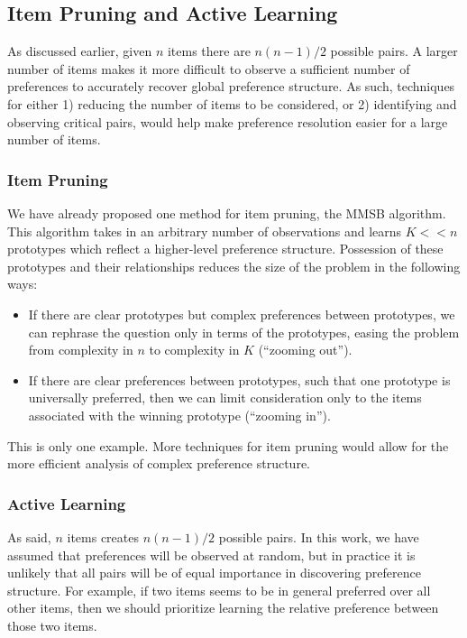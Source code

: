 \subsection{Item Pruning and Active Learning}

As discussed earlier, given $n$ items there are $n(n-1)/2$ possible pairs.
A larger number of items makes it more difficult to observe a sufficient number of preferences to accurately recover global preference structure.
As such, techniques for either 1) reducing the number of items to be considered, or 2) identifying and observing critical pairs, would help make preference resolution easier for a large number of items.

\subsubsection{Item Pruning}

We have already proposed one method for item pruning, the MMSB algorithm.
This algorithm takes in an arbitrary number of observations and learns $K << n$ prototypes which reflect a higher-level preference structure.
Possession of these prototypes and their relationships reduces the size of the problem in the following ways: 

\begin{itemize}
	\item If there are clear prototypes but complex preferences between prototypes, we can rephrase the question only in terms of the prototypes, easing the problem from complexity in $n$ to complexity in $K$ (``zooming out'').
	\item If there are clear preferences between prototypes, such that one prototype is universally preferred, then we can limit consideration only to the items associated with the winning prototype (``zooming in'').
\end{itemize}

This is only one example.
More techniques for item pruning would allow for the more efficient analysis of complex preference structure.

\subsubsection{Active Learning}

As said, $n$ items creates $n(n-1)/2$ possible pairs.
In this work, we have assumed that preferences will be observed at random, but in practice it is unlikely that all pairs will be of equal importance in discovering preference structure.
For example, if two items seems to be in general preferred over all other items, then we should prioritize learning the relative preference between those two items.

